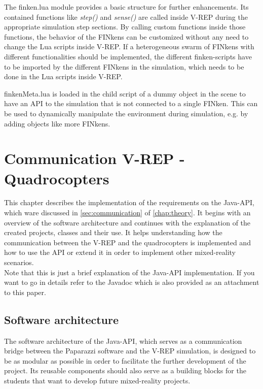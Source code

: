 The finken.lua module provides a basic structure for further enhancements. Its contained functions like \textit{step()} and \textit{sense()} are called  inside V-REP during the appropriate simulation step sections. 
By calling custom functions inside those functions, the behavior of the FINkens can be customized without any need to change the Lua scripts inside V-REP. 
If a heterogeneous swarm of FINkens with different functionalities should be implemented, the different finken-scripts have to be imported by the different FINkens in the simulation, which needs to be done in the Lua scripts inside V-REP.


finkenMeta.lua is loaded in the child script of a dummy object in the scene  to have an API to the simulation that is not connected to a single FINken. 
This can be used to dynamically manipulate the environment during simulation, e.g. by adding objects like more FINkens.

\section{Communication V-REP - Quadrocopters}
\label{sec:commImplementation}

This chapter describes the implementation of the requirements on the Java-API, which ware discussed in \ref{sec:communication} of \ref{chap:theory}. 
It begins with an overview of the software architecture and continues with the explanation of the created projects, classes and their use. 
It helps understanding how the communication between the V-REP and the quadrocopters is implemented and how to use the API or extend it in order to implement other mixed-reality scenarios.\\
Note that this is just a brief explanation of the Java-API implementation. If you want to go in details refer to the Javadoc which is also provided as an attachment to this paper.

\subsection{Software architecture}

The software architecture of the Java-API, which serves as a communication bridge between the Paparazzi software and the V-REP simulation, is designed to be as modular as possible in order to facilitate the further development of the project. 
Its reusable components should also serve as a building blocks for the students that want to develop future mixed-reality projects. \\

